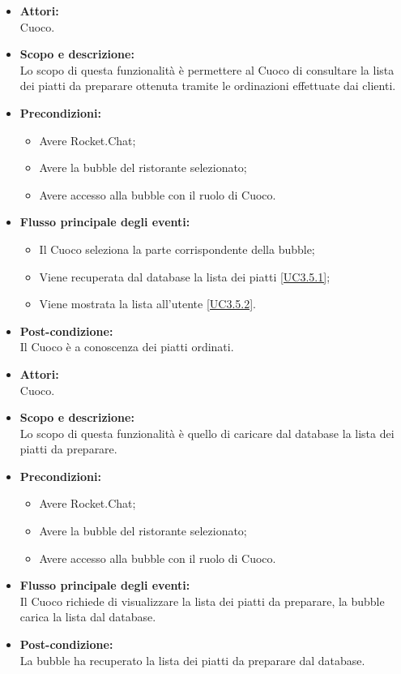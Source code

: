 \begin{itemize}
	\item \textbf{Attori:}
	\\Cuoco.
	\item \textbf{Scopo e descrizione:} 
	\\Lo scopo di questa funzionalità è permettere al Cuoco di consultare la lista dei piatti da preparare ottenuta tramite le ordinazioni effettuate dai clienti.
	\item \textbf{Precondizioni:}
	\begin{itemize}
		\item Avere Rocket.Chat;
		\item Avere la bubble del ristorante selezionato;
		\item Avere accesso alla bubble con il ruolo di Cuoco.
	\end{itemize}
	\item \textbf{Flusso principale degli eventi:}
	\begin{itemize}
		\item Il Cuoco seleziona la parte corrispondente della bubble;
		\item Viene recuperata dal database la lista dei piatti \ref{UC3.5.1};
		\item Viene mostrata la lista all'utente \ref{UC3.5.2}.
	\end{itemize}
	\item \textbf{Post-condizione:}
	\\Il Cuoco è a conoscenza dei piatti ordinati.
\end{itemize}


\begin{itemize}
	\item \textbf{Attori:}
	\\Cuoco.
	\item \textbf{Scopo e descrizione:} 
	\\Lo scopo di questa funzionalità è quello di caricare dal database la lista dei piatti da preparare.
	\item \textbf{Precondizioni:}
	\begin{itemize}
		\item Avere Rocket.Chat;
		\item Avere la bubble del ristorante selezionato;
		\item Avere accesso alla bubble con il ruolo di Cuoco.
	\end{itemize}
	\item \textbf{Flusso principale degli eventi:}
	\\Il Cuoco richiede di visualizzare la lista dei piatti da preparare, la bubble carica la lista dal database.
	\item \textbf{Post-condizione:}
	\\La bubble ha recuperato la lista dei piatti da preparare dal database.
\end{itemize}

